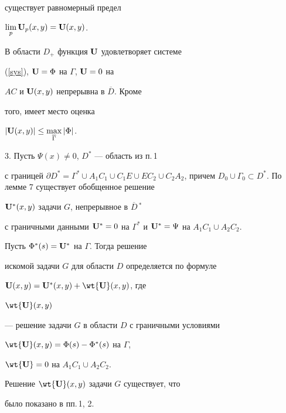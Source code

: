 существует равномерный предел


$\lim\limits_p{\bold U}_p(x,y)={\bold U}(x,y)$.





В области $D_+$ функция ${\bold U}$ удовлетворяет системе


(\ref{sys}), ${\bold U}=\Phi$ на $\Gamma$, ${\bold U}=0$ на


$AC$ и ${\bold U}(x,y)$ непрерывна в $\overline D$. Кроме


того, имеет место оценка


$|{\bold U}(x,y)|\le \max\limits_{\overline \Gamma }|\Phi|$.









3. Пусть $\Psi(x)\ne 0$, $D^*$ --- область из п.\,1


с границей $\partial D^*=\Gamma^*\cup A_1C_1 \cup C_1E


\cup EC_2 \cup C_2A_2$, причем $D_0\cup


\Gamma_0\subset D^*$. По лемме 7 существует обобщенное решение


${\bold U}^*(x,y)$ задачи $G$, непрерывное в $\overline D\,^*$


с граничными данными ${\bold U}^*=0$ на $\Gamma^*$ и ${\bold


U}^*=\Psi $ на $A_1C_1\cup A_2C_2$.





Пусть $\Phi^*(s)={\bold U}^*$ на $\Gamma$. Тогда решение


искомой задачи $G$ для области $D$ определяется по формуле


${\bold U}(x,y)={\bold U}^*(x,y)+\wt {\bold U}(x,y)$, где


$\wt {\bold U}(x,y)$


--- решение задачи $G$ в области $D$ с граничными условиями


$\wt {\bold U}(x,y)=\Phi(s)-\Phi^*(s)$ на $\Gamma$,


$\wt {\bold U}=0$ на $A_1C_1\cup A_2C_2$.





Решение $\wt {\bold U}(x,y)$ задачи $G$ существует, что


было показано в пп.\,1, 2.





